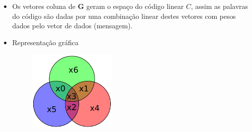 \begin{frame}[allowframebreaks]
\begin{itemize}
\begin{equation}
\begin{array}{cccc}
        1 & 0 & 0 & 0 \\
        0 & 1 & 0 & 0 \\
        0 & 0 & 1 & 0 \\
        0 & 0 & 0 & 1 \\
        \hdashline[2pt/2pt]
        0 & 1 & 1 & 1 \\
        1 & 0 & 1 & 1 \\
        1 & 1 & 0 & 1 
	\end{array}
  \right) = \left( \begin{array}{c} \mathbf{I} \\ \hdashline[2pt/2pt] \mathbf{P} \end{array} \right).
	\end{equation}
  \item Os vetores coluna de $\mathbf{G}$ geram o espaço do código linear $C$, assim as palavras do código são dadas por uma combinação linear destes vetores com pesos dados pelo vetor de dados (mensagem).
  \item Representação gráfica

                \begin{figure}[h!]
                \centering
                \includegraphics[width=0.4\textwidth]{images/hamming74.pdf}
                \label{fig:hamming74}
                \end{figure}


\end{itemize}
\end{frame}
